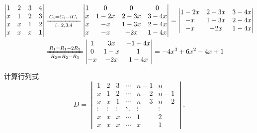 \begin{solution}
    \begin{align*}
    \begin{vmatrix}
    1 & 2 & 3 & 4 \\
    x & 1 & 2 & 3 \\
    x & x & 1 & 2 \\
    x & x & x & 1
    \end{vmatrix}
    &\xlongequal[i=2,3,4]{C_i = C_i - iC_1}
    \begin{vmatrix}
    1 & 0    & 0    & 0    \\
    x & 1-2x & 2-3x & 3-4x \\
    x & -x   & 1-3x & 2-4x \\
    x & -x   & -2x  & 1-4x
    \end{vmatrix}
    =
    \begin{vmatrix}
    1-2x & 2-3x & 3-4x \\
    -x   & 1-3x & 2-4x \\
    -x   & -2x  & 1-4x
    \end{vmatrix} \\
    &\xlongequal[R_2 = R_2-R_3]{R_1 = R_1-2R_2}
    \begin{vmatrix}
    1 & 3x & -1+4x \\
    0 & 1-x & 1 \\
    -x & -2x & 1-4x
    \end{vmatrix}
    = -4x^3+6x^2-4x+1
    \end{align*}
\end{solution}

\begin{exercise}[14--15 秋冬]
    计算行列式
    \[
        D = \begin{vmatrix}
            1 & 2 & 3 & \cdots & n - 1 & n \\
            x & 1 & 2 & \cdots & n - 2 & n - 1 \\
            x & x & 1 & \cdots & n - 3 & n - 2 \\
            \vdots & \vdots & \vdots & \ddots & \vdots & \vdots \\
            x & x & x & \cdots & 1 & 2 \\
            x & x & x & \cdots & x & 1
        \end{vmatrix}.
    \]
\end{exercise}

